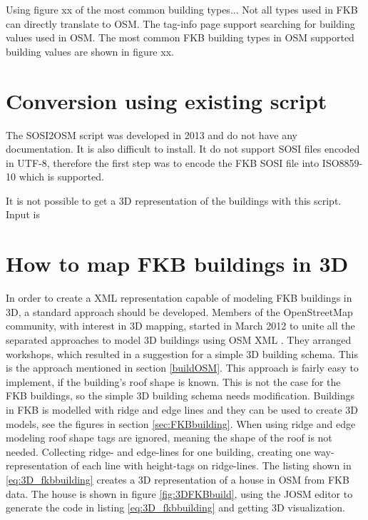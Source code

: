 Using figure xx of the most common building types... Not all types used in FKB can directly translate to OSM. The tag-info page support searching for building values used in OSM. The most common FKB building types in OSM supported building values are shown in figure xx.


\section{Conversion using existing script}

The SOSI2OSM script was developed in 2013 and do not have any documentation. It is also difficult to install. It do not support SOSI files encoded in UTF-8, therefore the first step was to encode the FKB SOSI file into ISO8859-10 which is supported. %

It is not possible to get a 3D representation of the buildings with this script. Input is 


\section{How to map FKB buildings in 3D}
In order to create a XML representation capable of modeling FKB buildings in 3D, a standard approach should be developed. Members of the OpenStreetMap community, with interest in 3D mapping, started in March 2012 to unite all the separated approaches to model 3D buildings using OSM XML \cite{OpenStreetMapm}. They arranged workshops, which resulted in a suggestion for a simple 3D building schema. This is the approach mentioned in section \ref{buildOSM}. This approach is fairly easy to implement, if the building's roof shape is known. This is not the case for the FKB buildings, so the simple 3D building schema needs modification. Buildings in FKB is modelled with ridge and edge lines and they can be used to create 3D models, see the figures in section \ref{sec:FKBbuilding}. When using ridge and edge modeling roof shape tags are ignored, meaning the shape of the roof is not needed. Collecting ridge- and edge-lines for one building, creating one way-representation of each line with height-tags on ridge-lines. The listing shown in \ref{eq:3D_fkbbuilding} creates a 3D representation of a house in OSM from FKB data. The house is shown in figure \ref{fig:3DFKBbuild}, using the JOSM editor to generate the code in listing \ref{eq:3D_fkbbuilding} and getting 3D visualization.

